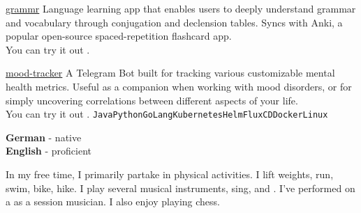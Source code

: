 \documentclass[9pt]{developercv} %
\begin{document}
    \begin{entrylist}
        \project
        {\href{https://github.com/twaslowski/grammr}{ grammr}}
        {
            Language learning app that enables users to deeply understand grammar and vocabulary through conjugation
            and declension tables. Syncs with Anki, a popular open-source spaced-repetition flashcard app.\\
        You can try it out .
        }

        \project
        {\href{https://github.com/twaslowski/open-mood-tracker}{ mood-tracker}}
        {
            A Telegram Bot built for tracking various customizable mental health metrics. Useful as a companion when
            working with mood disorders, or for simply uncovering correlations between different aspects of your life.\\
        You can try it out .
        }
        \texttt{Java}\slashsep\texttt{Python}\slashsep\texttt{GoLang}\slashsep\texttt{Kubernetes}\slashsep\texttt{Helm}\slashsep\texttt{FluxCD}\slashsep\texttt{Docker}\slashsep\texttt{Linux}

    \end{entrylist}


    \begin{minipage}[t]{0.3\textwidth}
        \vspace{-\baselineskip} %


        \textbf{German} - native\\
        \textbf{English} - proficient\\
    \end{minipage}
    \hfill
    \begin{minipage}[t]{0.5\textwidth}
        \vspace{-\baselineskip} %


        In my free time, I primarily partake in physical activities.
        I lift weights, run, swim, bike, hike.
        I play several musical instruments, sing, and
        .
        I've performed on a
        as a session musician.
        I also enjoy playing chess.
    \end{minipage}
    \hfill
    \vfill
\end{document}
